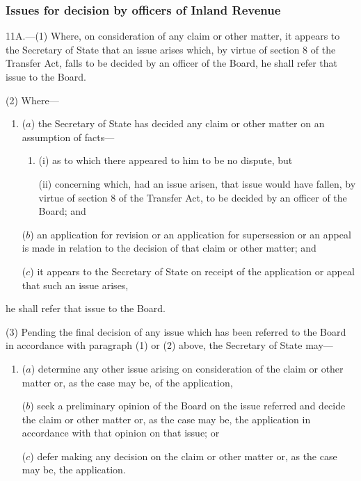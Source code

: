 \documentclass[12pt,a4paper]{article}
\begin{document}

\subsubsection[11A. Issues for decision by officers of Inland Revenue]{Issues for decision by officers of Inland Revenue}

11A.---(1)  Where, on consideration of any claim or other matter, it appears to the Secretary of State that an issue arises which, by virtue of section 8 of the Transfer Act, falls to be decided by an officer of the Board, he shall refer that issue to the Board.

(2) Where—
\begin{enumerate}\item[]
($a$) the Secretary of State has decided any claim or other matter on an assumption of facts—
\begin{enumerate}\item[]
(i) as to which there appeared to him to be no dispute, but

(ii) concerning which, had an issue arisen, that issue would have fallen, by virtue of section 8 of the Transfer Act, to be decided by an officer of the Board; and
\end{enumerate}

($b$) an application for revision or an application for supersession 
or an appeal  %
is made in relation to the decision of that claim or other matter; and

($c$) it appears to the Secretary of State on 
receipt of the application or appeal  %
that such an issue arises,
\end{enumerate}
he shall refer that issue to the Board.

(3) Pending the final decision of any issue which has been referred to the Board in accordance with paragraph (1) or (2) above, the Secretary of State may—
\begin{enumerate}\item[]
($a$) determine any other issue arising on consideration of the claim or other matter or, as the case may be, of the application,

($b$) seek a preliminary opinion of the Board on the issue referred and decide the claim or other matter or, as the case may be, the application in accordance with that opinion on that issue; or

($c$) defer making any decision on the claim or other matter or, as the case may be, the application.
\end{enumerate}
\end{document}
